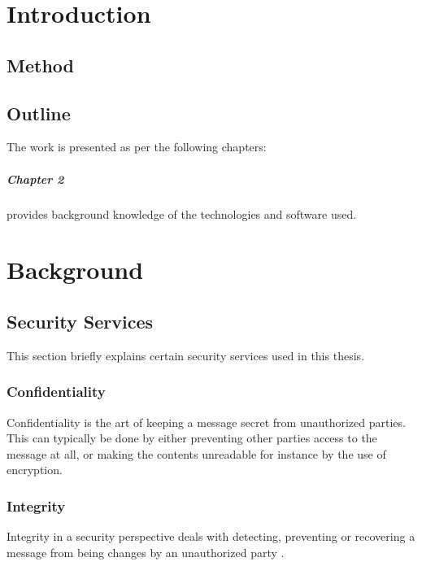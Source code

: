 \documentclass[english,12pt,a4paper]{book}
\begin{document}
\chapter{Introduction}
\setcounter{page}{1}

\section{Method}

\section{Outline}

The work is presented as per the following chapters:

\paragraph{Chapter 2} provides background knowledge of the technologies and
software used.


\chapter{Background}

\section{Security Services}
This section briefly explains certain security services used in this
thesis.

\subsection{Confidentiality}
Confidentiality is the art of keeping a message secret from unauthorized
parties\cite[p. 18]{stallings}. This can typically be done by either preventing other parties access
to the message at all, or making the contents unreadable for instance by the
use of encryption. 

\subsection{Integrity}
Integrity in a security perspective deals with detecting, preventing or
recovering a message from being changes by an unauthorized party \cite[p.
18]{stallings}.
\end{document}
